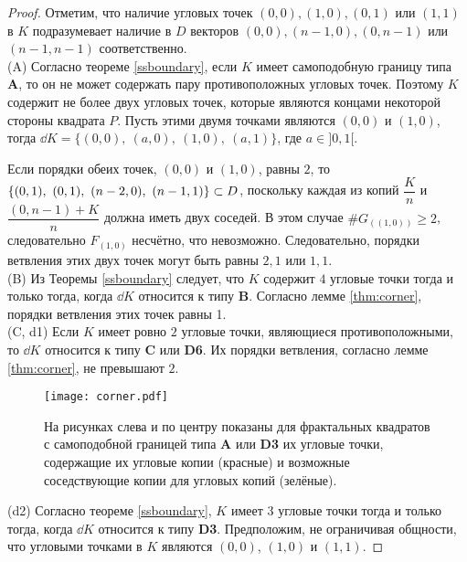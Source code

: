 \begin{proof}

Отметим, что наличие угловых точек $(0,0), (1,0), (0,1)$ или $(1,1)$ в $K$ подразумевает наличие в $D$  векторов $(0,0), (n-1,0), (0,n-1)$ или $(n-1,n-1)$ соответственно.
\\

(A) Согласно теореме \ref{ssboundary}, если $K$ имеет самоподобную границу типа {\bf A}, то он не может содержать пару противоположных угловых точек. 
Поэтому $K$ содержит не более двух угловых точек, которые являются концами некоторой стороны квадрата $P$. 
Пусть этими двумя точками являются $(0,0)$ и $(1,0)$, тогда $\dd K=\{(0,0),\ (a,0),\ (1,0),\ (a,1)\}$, где $a\in]0,1[$. 

Если порядки обеих точек, $(0,0)$ и $(1,0)$,  равны $2$, то $\{(0,1),\ (0,1),\ (n-2,0),\ (n-1,1)\}\subset D$, поскольку каждая из копий $\dfrac{K}{n}$ и $\dfrac{(0,n-1)+K}{n}$ должна иметь двух соседей. 
В этом случае $\#G_{((1,0))}\geq2$, следовательно $F_{(1,0)}$ несчётно, что невозможно.
Следовательно, порядки ветвления этих двух точек могут быть равны $2,1$ или $1,1$.\\

(B) Из Теоремы \ref{ssboundary} следует, что $K$ содержит $4$ угловые точки тогда и только тогда, когда $\dd K$ относится к типу {\bf B}.
Согласно лемме \ref{thm:corner}, порядки ветвления этих точек равны 1.\\

(C, d1) Если $K$ имеет ровно $2$ угловые точки, являющиеся противоположными, то $\dd K$ относится к типу {\bf C} или {\bf D6}.
Их порядки ветвления, согласно лемме \ref{thm:corner}, не превышают $2$.
\begin{figure}[H]
\centering
\texttt{[image: corner.pdf]}
\caption{На рисунках слева и по центру показаны для фрактальных квадратов с самоподобной границей типа {\bf A} или {\bf D3} их угловые точки, содержащие их угловые копии (красные) и возможные соседствующие копии для угловых копий (зелёные).
}
\label{fig:corner}
\end{figure}

(d2) Согласно теореме \ref{ssboundary}, $K$ имеет $3$ угловые точки тогда и только тогда, когда $\dd K$ относится к типу {\bf D3}.
Предположим, не ограничивая общности, что угловыми точками в $K$ являются $(0,0)$, $(1,0)$ и $(1,1)$.


\end{proof}
